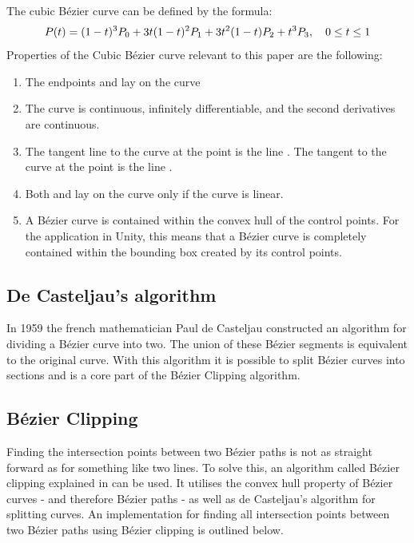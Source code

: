     
        The cubic Bézier curve can be defined by the formula\cite{Cubic-Bézier-Curves}: 
        $$
            P(t) = (1-t)^3P_0 + 3t(1 - t)^2P_1 + 3t^2(1 - t)P_2 + t^3P_3 , \quad 0 \le t \le 1
        $$
        Properties of the Cubic Bézier curve relevant to this paper are the following:
        \begin{enumerate}
            \item The endpoints  and  lay on the curve
            \item The curve is continuous, infinitely differentiable, and the second derivatives are continuous.
            \item The tangent line to the curve at the point  is the line . The tangent to the
        curve at the point  is the line .
            \item Both  and  lay on the curve only if the curve is linear.
            \item A Bézier curve is contained within the convex hull of the control points. For the application in Unity, this means that a Bézier curve is completely contained within the bounding box created by its control points.
        \end{enumerate}


    \subsection{De Casteljau's algorithm}
        In 1959 the french mathematician Paul de Casteljau constructed an algorithm for dividing a Bézier curve into two. The union of these Bézier segments is equivalent to the original curve. With this algorithm it is possible to split Bézier curves into sections and is a core part of the Bézier Clipping algorithm.
    
    \subsection{Bézier Clipping}
        Finding the intersection points between two Bézier paths is not as straight forward as for something like two lines. To solve this, an algorithm called Bézier clipping explained in \cite{bezier-clipping} can be used. It utilises the convex hull property of Bézier curves - and therefore Bézier paths - as well as de Casteljau's algorithm for splitting curves. An implementation for finding all intersection points between two Bézier paths using Bézier clipping is outlined below.


